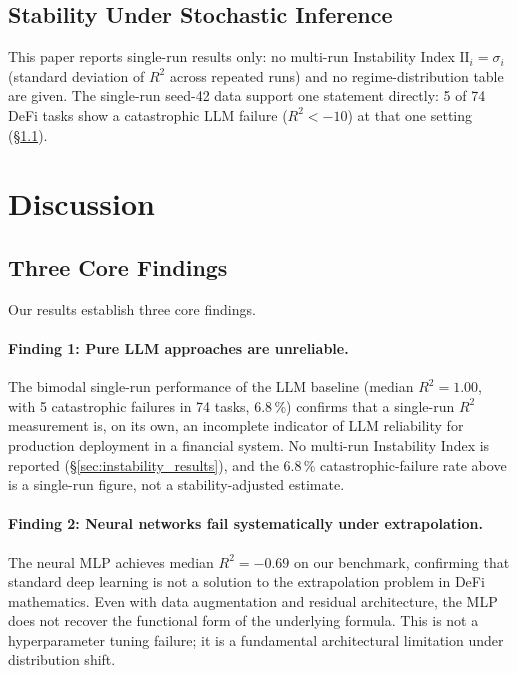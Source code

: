 \documentclass[twoside,11pt]{article}
\newcommand{\Rsq}{R^{2}}
\newcommand{\II}{\mathrm{II}}
\begin{document}
\subsection{Stability Under Stochastic Inference}\label{subsec:stability-under-stochastic-inference}
\label{sec:instability_results}

This paper reports single-run results only: no multi-run Instability Index
$\II_i = \sigma_i$ (standard deviation of $\Rsq$ across repeated runs) and no
regime-distribution table are given. The single-run seed-42 data support one
statement directly: 5 of 74 DeFi tasks show a catastrophic LLM failure
($\Rsq < -10$) at that one setting (\S\ref{subsec:three-core-findings}).

\section{Discussion}
\label{sec:discussion}

\subsection{Three Core Findings}\label{subsec:three-core-findings}
\label{sec:disc_findings}

Our results establish three core findings.

\paragraph{Finding 1: Pure LLM approaches are unreliable.}
The bimodal single-run performance of the LLM baseline (median $\Rsq=1.00$,
with 5 catastrophic failures in 74 tasks, 6.8\,\%) confirms that a single-run
$\Rsq$ measurement is, on its own, an incomplete indicator of LLM reliability
for production deployment in a financial system. No multi-run Instability Index is reported (\S\ref{sec:instability_results}),
and the 6.8\,\% catastrophic-failure rate above is a
single-run figure, not a stability-adjusted estimate.

\paragraph{Finding 2: Neural networks fail systematically under extrapolation.}
The neural MLP achieves median $\Rsq=-0.69$ on our benchmark, confirming that
standard deep learning is not a solution to the extrapolation problem in DeFi
mathematics.  Even with data augmentation and residual architecture, the MLP does
not recover the functional form of the underlying formula.  This is not a
hyperparameter tuning failure; it is a fundamental architectural limitation under
distribution shift.
\end{document}

